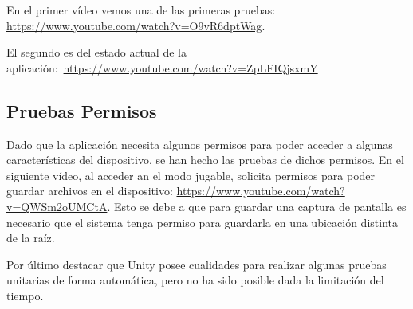 En el primer vídeo vemos una de las primeras pruebas: \url{https://www.youtube.com/watch?v=O9vR6dptWag}.

 El segundo es del estado actual de la aplicación:~\url{https://www.youtube.com/watch?v=ZpLFIQjsxmY}

\subsection{Pruebas Permisos}
Dado que la aplicación necesita algunos permisos para poder acceder a algunas características del dispositivo, se han hecho las pruebas de dichos permisos. En el siguiente vídeo, al acceder an el modo jugable, solicita permisos para poder guardar archivos en el dispositivo: \url{https://www.youtube.com/watch?v=QWSm2oUMCtA}. Esto se debe a que para guardar una captura de pantalla es necesario que el sistema tenga permiso para guardarla en una ubicación distinta de la raíz.




Por último destacar que Unity posee cualidades para realizar algunas pruebas unitarias de forma automática, pero no ha sido posible dada la limitación del tiempo.